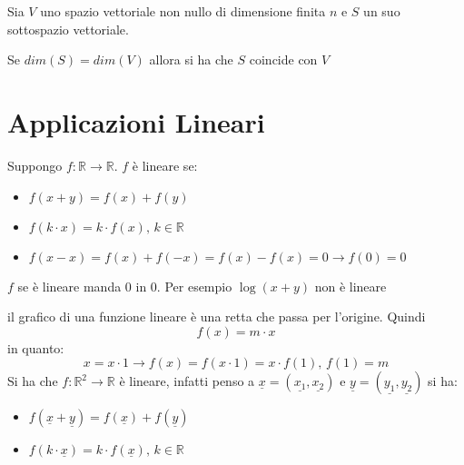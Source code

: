 \documentclass[a4paper,12pt, oneside]{book}
\begin{document}
\begin{teorema}
	Sia $V$ uno spazio vettoriale non nullo di dimensione finita $n$ e $S$ un suo sottospazio vettoriale.\begin{center} Se $dim(S)=dim(V)$ allora si ha che $S$ coincide con $V$\end{center}
\end{teorema}

\chapter{Applicazioni Lineari}
\begin{definizione}
	Suppongo $f:\mathbb{R}\rightarrow \mathbb{R}$. $f$ è lineare se:
	\begin{itemize}
		\item $f(x+y)=f(x)+f(y)$
		\item $f(k\cdot x)=k\cdot f(x), \,k\in \mathbb{R}$
		\item $f(x-x)=f(x)+f(-x)= f(x)-f(x)=0\longrightarrow f(0)=0$
	\end{itemize}
	$f$ se è lineare manda 0 in 0.
	Per esempio $\log(x+y)$ non è lineare
\end{definizione}
il grafico di una funzione lineare è una retta che passa per l'origine.
Quindi $$f(x)=m\cdot x$$ in quanto: $$x=x\cdot 1\rightarrow f(x)=f(x\cdot 1)=x\cdot f(1),\, f(1)=m$$
Si ha che $f:\mathbb{R}^2\rightarrow \mathbb{R}$ è lineare, infatti penso a $\underline{x}=(\underline{x_1},\underline{x_2})$  e $\underline{y}=(\underline{y_1},\underline{y_2})$ si ha:
\begin{itemize}
	\item  $f(\underline{x}+\underline{y})=f(\underline{x})+f(\underline{y})$
	\item $f(k\cdot \underline{x})=k\cdot f(\underline{x}), \,k\in \mathbb{R}$
\end{itemize}
\end{document}
